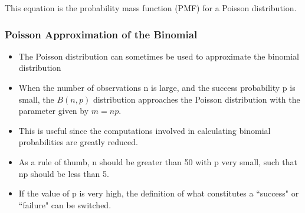 \documentclass[12pt, a4paper]{report}
\theoremstyle{definition}
\theoremstyle{remark}
\begin{document}
This equation is the probability mass function (PMF) for a Poisson distribution.
\begin{frame}
	\frametitle{Poisson Approximation of the Binomial}
	\begin{itemize}
		\item The Poisson distribution can sometimes be used to approximate the
		binomial distribution
		\item When the number of observations n is large, and the success probability
		p is small, the $B(n,p)$ distribution approaches the Poisson distribution
		with the parameter given by $m = np$.
		\item This is useful since the computations involved in calculating binomial
		probabilities are greatly reduced.
		\item As a rule of thumb, n should be greater than 50 with p very small, such
		that np should be less than 5.
		\item If the value of p is very high, the definition of what constitutes a
		``success" or ``failure" can be switched.
	\end{itemize}
\end{frame}
\end{document}
